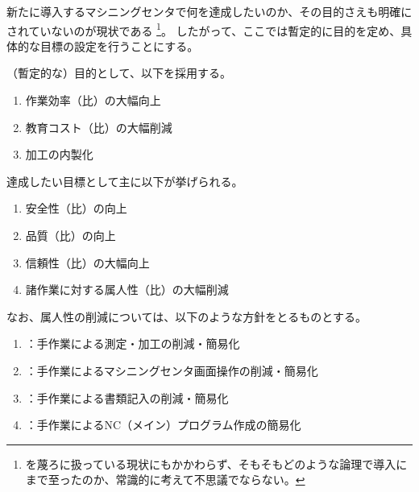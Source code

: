 

新たに導入するマシニングセンタで何を達成したいのか、その目的さえも明確にされていないのが現状である
\footnote{\MMC を蔑ろに扱っている現状にもかかわらず、そもそもどのような論理で導入にまで至ったのか、常識的に考えて不思議でならない。}。
したがって、ここでは暫定的に目的を定め、具体的な目標の設定を行うことにする。



（暫定的な）目的として、以下を採用する。
\begin{enumerate}[label=\sarrow]
\item 作業効率（\MMC 比）の大幅向上
\item 教育コスト（\MMC 比）の大幅削減
\item \Dimple 加工の内製化
\end{enumerate}



達成したい目標として主に以下が挙げられる。
\begin{enumerate}[label=\sarrow]
\item 安全性（\MMC 比）の向上
\item 品質（\MMC 比）の向上
\item 信頼性（\MMC 比）の大幅向上
\item 諸作業に対する属人性（\MMC 比）の大幅削減
\end{enumerate}
なお、属人性の削減については、以下のような方針をとるものとする。
\begin{enumerate}[label=\sarrow]
\item {}：手作業による測定・加工の削減・簡易化
\item {}：手作業によるマシニングセンタ画面操作の削減・簡易化
\item {}：手作業による書類記入の削減・簡易化
\item {}：手作業によるNC（メイン）プログラム作成の簡易化
\end{enumerate}


